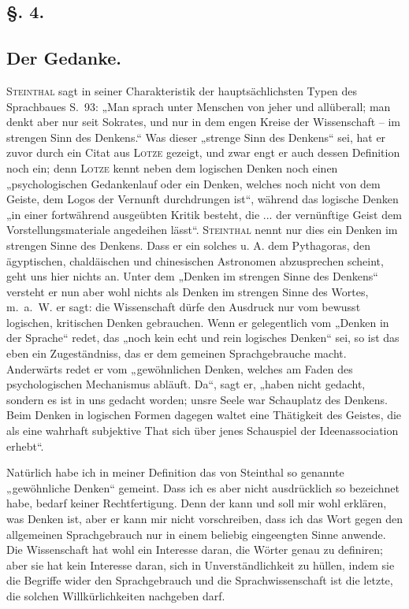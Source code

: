 \subsection*{§. 4.}\label{I.I.4}
\subsection*{Der Gedanke.}

\textsc{Steinthal} sagt in seiner Charakteristik der hauptsächlichsten Typen des Sprachbaues S.~93: „Man sprach unter Menschen von jeher und allüberall; man denkt aber nur seit Sokrates, und nur in dem engen Kreise der Wissenschaft – im strengen Sinn des Denkens.“ Was dieser „strenge Sinn des Denkens“ sei, hat er zuvor durch ein Citat aus \textsc{Lotze} gezeigt, und zwar engt er auch dessen Definition noch ein; denn \textsc{Lotze} kennt neben dem logischen Denken noch einen „psychologischen Gedankenlauf oder ein Denken, welches noch nicht von dem Geiste, dem Logos der Vernunft durchdrungen ist“, während das logische Denken „in einer fortwährend ausgeübten Kritik besteht, die ... der vernünftige Geist dem Vorstellungsmateriale angedeihen lässt“. \textsc{Steinthal} nennt nur dies ein Denken im strengen Sinne des Denkens. Dass er ein solches u. A. dem Pythagoras, den ägyptischen, chaldäischen und chinesischen Astronomen abzusprechen scheint, geht uns hier nichts an. Unter dem „Denken im strengen Sinne des Denkens“ versteht er nun aber wohl nichts  als Denken im strengen Sinne des Wortes, m.~a.~W. er sagt: die Wissenschaft dürfe den Ausdruck nur vom bewusst logischen, kritischen Denken gebrauchen. Wenn er gelegentlich vom „Denken in der Sprache“ redet, das „noch kein echt und rein logisches Denken“ sei, so ist das eben ein Zugeständniss, das er dem gemeinen Sprachgebrauche macht. Anderwärts redet er vom „gewöhnlichen Denken, welches am Faden des psychologischen Mechanismus abläuft. Da“, sagt er, „haben nicht  gedacht, sondern es ist in uns gedacht worden; unsre Seele war Schauplatz des Denkens. Beim Denken in logischen Formen dagegen waltet eine Thätigkeit des Geistes, die als \label{sp.7} eine wahrhaft subjektive That sich über jenes Schauspiel der Ideenassociation erhebt“.

\label{fp.8}

Natürlich habe ich in meiner Definition das von Steinthal so genannte „gewöhnliche Denken“ gemeint. Dass ich es aber nicht ausdrücklich so bezeichnet habe, bedarf keiner Rechtfertigung. Denn der  kann und soll mir wohl erklären, was Denken ist, aber er kann mir nicht vorschreiben, dass ich das Wort gegen den allgemeinen Sprachgebrauch nur in einem beliebig eingeengten Sinne anwende. Die Wissenschaft hat wohl ein Interesse daran, die Wörter genau zu definiren; aber sie hat kein Interesse daran, sich in Unverständlichkeit zu hüllen, indem sie die Begriffe wider den Sprachgebrauch  und die Sprachwissenschaft ist die letzte, die solchen Willkürlichkeiten nachgeben darf.

